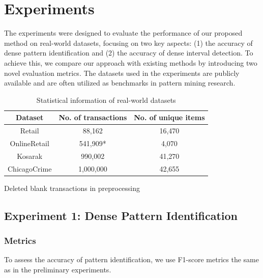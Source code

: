 \section{Experiments}
\label{sec:experiments}
The experiments were designed to evaluate the performance of our proposed method on real-world datasets, focusing on two key aspects: (1) the accuracy of dense pattern identification and (2) the accuracy of dense interval detection. To achieve this, we compare our approach with existing methods by introducing two novel evaluation metrics.
The datasets used in the experiments are publicly available and are often utilized as benchmarks in pattern mining research\cite{fournier2016spmf}. 

\begin{table}[t]
    \centering
    \begin{threeparttable}
    \caption{Statistical information of real-world datasets}
    \label{tab:dataset_stats}
    \begin{tabular}{|c|c|c|}
    \hline
    Dataset       & No. of transactions & No. of unique items \\
    \hline
    Retail        & 88,162              & 16,470               \\
    OnlineRetail  & 541,909*            & 4,070                \\
    Kosarak       & 990,002             & 41,270               \\
    ChicagoCrime  & 1,000,000           & 42,655               \\
    \hline
    \end{tabular}
    \begin{tablenotes}
        \small{\item *Deleted blank transactions in preprocessing}
    \end{tablenotes}
    \end{threeparttable}
\end{table}


\subsection{Experiment 1: Dense Pattern Identification}
\subsubsection{Metrics}
To assess the accuracy of pattern identification, we use F1-score metrics the same as in the preliminary experiments.

